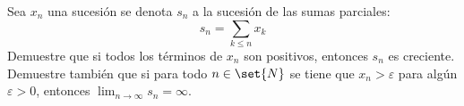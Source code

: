 \documentclass{ayudantia}
\begin{document}
\begin{prob}
    Sea \(x_n\) una sucesión se denota \(s_n\) a la sucesión de las sumas parciales:
    \begin{equation*}
        s_n=\sum_{k\leq n}x_k
    \end{equation*}
    Demuestre que si todos los términos de \(x_n\) son positivos, entonces \(s_n\) es creciente. Demuestre también que si para todo \(n\in\set{N}\) se tiene que \(x_n>\varepsilon\) para algún \(\varepsilon>0\), entonces \(\lim_{n\rightarrow\infty}s_n=\infty\).
\end{prob}

\begin{ans}
    \begin{sol}

    \end{sol}
\end{ans}
\end{document}
